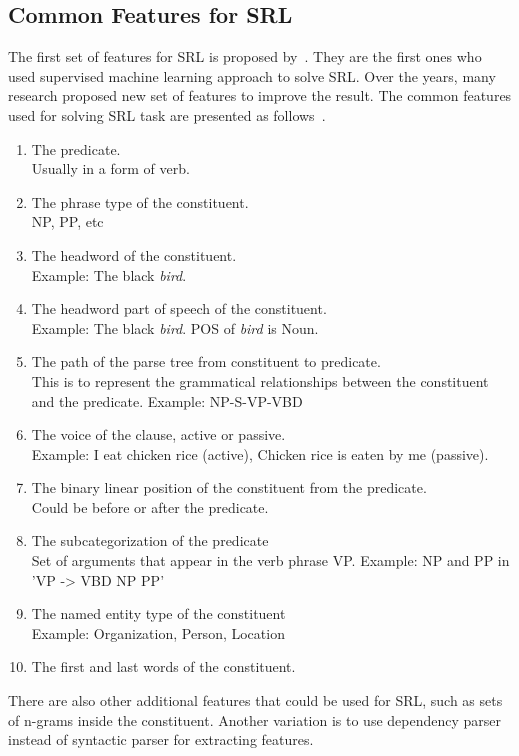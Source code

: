 \subsection{Common Features for SRL}
The first set of features for SRL is proposed by~\cite{gildea2002automatic}. They are the first ones who used supervised machine learning approach to solve SRL. Over the years, many research proposed new set of features to improve the result. The common features used for solving SRL task are presented as follows~\citep{jurafsky2016speech}.
\begin{enumerate}
	\item The predicate.\\
	Usually in a form of verb.
	\item The phrase type of the constituent.\\
	NP, PP, etc
	\item The headword of the constituent.\\
	Example: The black \textit{bird}.
	\item The headword part of speech of the constituent. \\
	Example: The black \textit{bird}. POS of \textit{bird} is Noun.
	\item The path of the parse tree from constituent to predicate. \\
	This is to represent the grammatical relationships between the constituent and the predicate.
	Example: NP-S-VP-VBD
	\item The voice of the clause, active or passive.\\
	Example: I eat chicken rice (active), Chicken rice is eaten by me (passive).
	\item The binary linear position of the constituent from the predicate.\\
	Could be before or after the predicate.
	\item The subcategorization of the predicate\\
	Set of arguments that appear in the verb phrase VP.
	Example: NP and PP in 'VP -> VBD NP PP'
	\item The named entity type of the constituent\\
	Example: Organization, Person, Location
	\item The first and last words of the constituent.
\end{enumerate}

There are also other additional features that could be used for SRL, such as sets of n-grams inside the constituent. Another variation is to use dependency parser instead of syntactic parser for extracting features.

